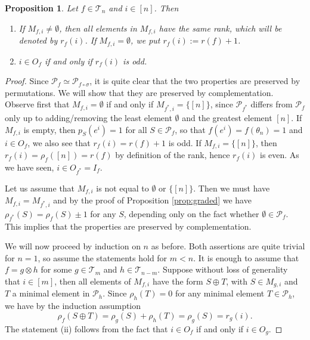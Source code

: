 \documentclass[12pt]{article}
\newtheorem{prop}{Proposition}
\theoremstyle{definition}
\theoremstyle{remark}
\def\Te{\mathcal T}
\def\Pe{\mathcal P}
\begin{document}
\begin{prop}\label{prop:pfinput} Let $f\in \Te_n$ and $i\in [n]$. Then
\begin{enumerate}
\item If $M_{f,i}\ne
\emptyset$, then all elements in $M_{f,i}$  have the same rank,  which will be
denoted by $r_f(i)$. If $M_{f,i}=\emptyset$, we put $r_f(i):=r(f)+1$. 
\item $i\in O_f$ if and only if $r_f(i)$ is odd.

\end{enumerate}
\end{prop}



\begin{proof} Since $\Pe_f\simeq \Pe_{f\circ\sigma}$, it is
quite clear that the two properties are preserved by permutations. We will show that they
are preserved by complementation. Observe first that $M_{f,i}=\emptyset$ if and only if
$M_{f^*,i}=\{[n]\}$, since $\Pe_{f^*}$ differs from $\Pe_f$ only up to adding/removing the
least element $\emptyset$ and the greatest element $[n]$. If $M_{f,i}$ is empty, then $p_S(e^i)=1$ for all $S\in
\Pe_f$, so that $f(e^i)=f(\theta_n)=1$ and $i\in O_f$, we also see that $r_f(i)=r(f)+1$ is odd.
If $M_{f,i}=\{[n]\}$, then $r_f(i)=\rho_f([n])=r(f)$ by definition of the rank, hence
$r_{f}(i)$ is even. As we have seen, $i\in O_{f^*}=I_f$. 

Let us assume that $M_{f,i}$ is not equal to $\emptyset$ or $\{[n]\}$. Then we must have
$M_{f,i}=M_{f^*,i}$ and by the
proof of Proposition \ref{prop:graded} we have  
$\rho_{f^*}(S)=\rho_f(S)\pm 1$ for any $S$, depending only on the fact whether $\emptyset
\in \Pe_f$. This implies that the properties are preserved by complementation.  


We will now proceed by induction on $n$ as before. Both  assertions are quite trivial for $n=1$,
so assume the statements hold for $m<n$. It is enough to assume that
$f=g\otimes h$ for some $g\in \Te_m$ and $h\in \Te_{n-m}$. 
Suppose without loss of generality that $i\in [m]$, then all elements of $M_{f,i}$ have
the form $S\oplus T$, with $S\in M_{g,i}$ and  $T$ a minimal element in $\Pe_h$. 
 Since $\rho_h(T)=0$ for any minimal element $T\in \Pe_h$, we have
by the induction assumption
\[
\rho_f(S\oplus T)=\rho_g(S)+\rho_h(T)=\rho_g(S)= r_g(i).
\]
The statement (ii) follows from the fact that $i\in O_f$ if and only if $i\in O_g$.


\end{proof}
\end{document}
